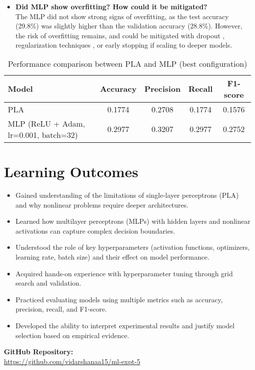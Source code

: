 \documentclass[11pt]{article}
\begin{document}
\begin{itemize}
    \item \textbf{Did MLP show overfitting? How could it be mitigated?} \\
The MLP did not show strong signs of overfitting, as the test accuracy (29.8\%) was slightly higher than the validation accuracy (28.8\%). 
However, the risk of overfitting remains, and could be mitigated with dropout \cite{srivastava2014dropout}, regularization techniques \cite{santos2022regularization}, or early stopping if scaling to deeper models.


\end{itemize}

\vspace{1cm}
\begin{table}[H]
\centering
\caption{Performance comparison between PLA and MLP (best configuration)}
\begin{tabular}{|l|c|c|c|c|}
\hline
\textbf{Model} & \textbf{Accuracy} & \textbf{Precision} & \textbf{Recall} & \textbf{F1-score} \\ \hline
PLA  & 0.1774 & 0.2708 & 0.1774 & 0.1576 \\ \hline
MLP (ReLU + Adam, lr=0.001, batch=32) & 0.2977 & 0.3207 & 0.2977 & 0.2752 \\ \hline
\end{tabular}
\end{table}


\vspace{3cm}
\section{Learning Outcomes}
\begin{itemize}
    \item Gained understanding of the limitations of single-layer perceptrons (PLA) and why nonlinear problems require deeper architectures.  
    \item Learned how multilayer perceptrons (MLPs) with hidden layers and nonlinear activations can capture complex decision boundaries.  
    \item Understood the role of key hyperparameters (activation functions, optimizers, learning rate, batch size) and their effect on model performance.  
    \item Acquired hands-on experience with hyperparameter tuning through grid search and validation.  
    \item Practiced evaluating models using multiple metrics such as accuracy, precision, recall, and F1-score.  
    \item Developed the ability to interpret experimental results and justify model selection based on empirical evidence.  
\end{itemize}


\vspace{1cm}
\noindent
\textbf{GitHub Repository:} \\
\href{https://github.com/vidarshanaa15/ml-expt-5}{https://github.com/vidarshanaa15/ml-expt-5}

\vspace{1cm}
\end{document}
